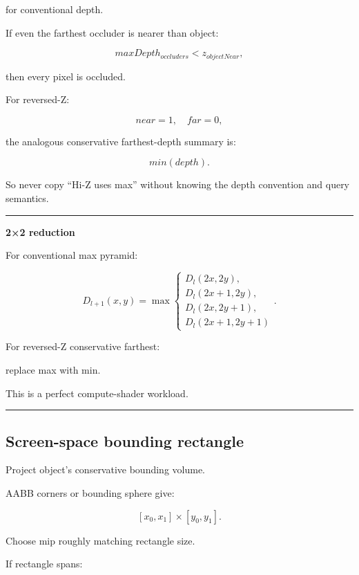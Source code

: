 for conventional depth.

If even the farthest occluder is nearer than object:

\[
maxDepth_{occluders}
<
z_{objectNear},
\]

then every pixel is occluded.

For reversed-Z:

\[
near=1,\quad far=0,
\]

the analogous conservative farthest-depth summary is:

\[
\boxed{
min(depth).
}
\]

So never copy ``Hi-Z uses max'' without knowing the depth convention and query semantics.

\begin{center}\rule{0.5\linewidth}{0.5pt}\end{center}

\textbf{2×2 reduction}

For conventional max pyramid:

\[
D_{l+1}(x,y)
=
\max
\begin{cases}
D_l(2x,2y),\\
D_l(2x+1,2y),\\
D_l(2x,2y+1),\\
D_l(2x+1,2y+1)
\end{cases}.
\]

For reversed-Z conservative farthest:

replace max with min.

This is a perfect compute-shader workload.

\begin{center}\rule{0.5\linewidth}{0.5pt}\end{center}

\subsection{Screen-space bounding rectangle}\label{04-visual-computing-ii-ch040-screen-space-bounding-rectangle}

\hypertarget{04-visual-computing-ii-ch040-screen-space-bounding-rectangle}{}

Project object's conservative bounding volume.

AABB corners or bounding sphere give:

\[
[x_0,x_1]
\times
[y_0,y_1].
\]

Choose mip roughly matching rectangle size.

If rectangle spans:

